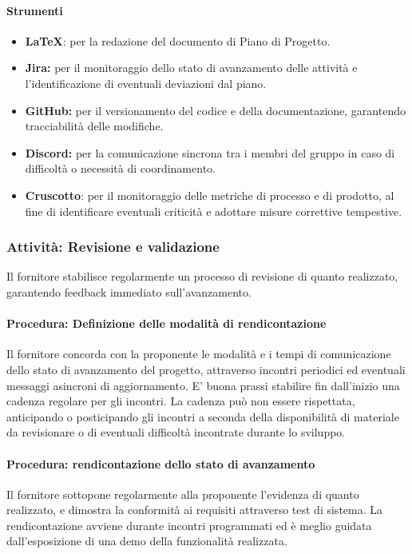 \documentclass[a4paper,12pt]{article}
\begin{document}
\paragraph{Strumenti}
\begin{itemize}
    \item \textbf{\LaTeX}: per la redazione del documento di Piano di Progetto.
    \item \textbf{Jira:} per il monitoraggio dello stato di avanzamento delle attività e l'identificazione di eventuali deviazioni dal piano.
    \item \textbf{GitHub:} per il versionamento del codice e della documentazione, garantendo tracciabilità delle modifiche.
    \item \textbf{Discord:} per la comunicazione sincrona tra i membri del gruppo in caso di difficoltà o necessità di coordinamento.
    \item \textbf{Cruscotto}: per il monitoraggio delle metriche di processo e di prodotto, al fine di identificare eventuali criticità e adottare misure correttive tempestive.
\end{itemize}

\subsubsection{Attività: Revisione e validazione}
Il fornitore stabilisce regolarmente un processo di revisione di quanto
realizzato, garantendo feedback immediato sull'avanzamento.

\paragraph{Procedura: Definizione delle modalità di rendicontazione}
Il fornitore concorda con la proponente le modalità e i tempi di comunicazione
dello stato di avanzamento del progetto, attraverso incontri periodici ed
eventuali messaggi asincroni di aggiornamento. E' buona prassi stabilire fin
dall'inizio una cadenza regolare per gli incontri. La cadenza può non essere
rispettata, anticipando o posticipando gli incontri a seconda della
disponibilità di materiale da revisionare o di eventuali difficoltà incontrate
durante lo sviluppo.

\paragraph{Procedura: rendicontazione dello stato di avanzamento}
Il fornitore sottopone regolarmente alla proponente l'evidenza di quanto
realizzato, e dimostra la conformità ai requisiti attraverso test di sistema.
La rendicontazione avviene durante incontri programmati ed è meglio guidata
dall'esposizione di una demo della funzionalità realizzata.
\end{document}
